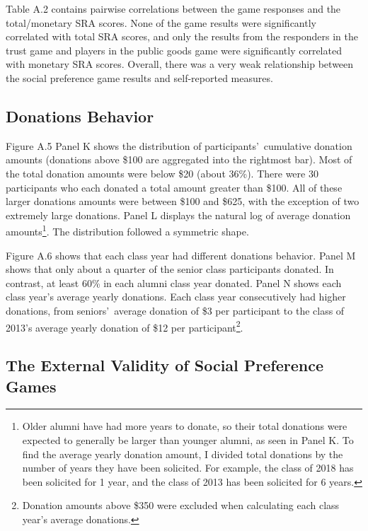 \documentclass[12pt]{article}
\begin{document}
Table A.2 contains pairwise correlations between the game responses and the total/monetary SRA scores. None of the game results were significantly correlated with total SRA scores, and only the results from the responders in the trust game and players in the public goods game were significantly correlated with monetary SRA scores. Overall, there was a very weak relationship between the social preference game results and self-reported measures. 

\subsection{Donations Behavior}

Figure A.5 Panel K shows the distribution of participants\rq \ cumulative donation amounts (donations above \$100 are aggregated into the rightmost bar). Most of the total donation amounts were below \$20 (about 36\%). There were 30 participants who each donated a total amount greater than \$100. All of these larger donations amounts were between \$100 and \$625, with the exception of two extremely large donations. Panel L displays the natural log of average donation amounts\footnote{Older alumni have had more years to donate, so their total donations were expected to generally be larger than younger alumni, as seen in Panel K. To find the average yearly donation amount, I divided total donations by the number of years they have been solicited. For example, the class of 2018 has been solicited for 1 year, and the class of 2013 has been solicited for 6 years.}. The distribution followed a symmetric shape.

Figure A.6 shows that each class year had different donations behavior. Panel M shows that only about a quarter of the senior class participants donated. In contrast, at least 60\% in each alumni class year donated. Panel N shows each class year\rq s average yearly donations. Each class year consecutively had higher donations, from seniors\rq \ average donation of \$3 per participant to the class of 2013\rq s average yearly donation of \$12 per participant\footnote{Donation amounts above \$350 were excluded when calculating each class year\rq s average donations.}.


\subsection{The External Validity of Social Preference Games}
\end{document}
